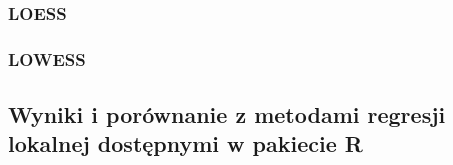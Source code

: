 \documentclass[
]{article}
\begin{document}
\hypertarget{loess}{%
\subsubsection{LOESS}\label{loess}}

\hypertarget{lowess}{%
\subsubsection{LOWESS}\label{lowess}}

\hypertarget{wyniki-i-poruxf3wnanie-z-metodami-regresji-lokalnej-dostux119pnymi-w-pakiecie-r}{%
\subsection{Wyniki i porównanie z metodami regresji lokalnej dostępnymi
w pakiecie
R}\label{wyniki-i-poruxf3wnanie-z-metodami-regresji-lokalnej-dostux119pnymi-w-pakiecie-r}}
\end{document}
